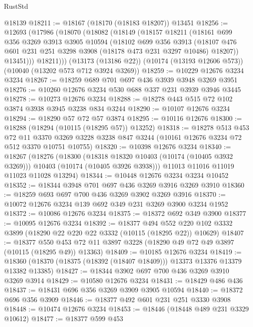 \begin{lexlean}{RustStd}
\begin{coremodule}
    @18139
@18211 := @18167 (@18170 (@18183 @18207)) @13451
@18256 := @12693
    (@17986
      (@18070
        (@18082
          (@18149
            (@18157
              @18211
              (@18161
                @699
                @356
                @3269
                @3913
                @3905
                @10594
                (@18102
                  @699
                  @356
                  @3913
                  (@18107 @476 @601 @231 @251 @3298 @3908 (@18178 @473 @231 @3297 @10486) @18207))
                @13451)))
          @18211)))
    (@13173 (@13186 @22))
    (@10174 (@13193 @12606 @573))
    (@10040 (@13202 @573 @712 @3924 @3269))
@18259 := @10229 @12676 @3234 @3234
@18267 := @18259 @689 @701 @697 @436 @3939 @3948 @3269 @3951
@18276 := @10260 @12676 @3234 @530 @688 @337 @231 @3939 @3946 @3445
@18278 := @10273 @12676 @3234
@18288 := @18278 @443 @515 @72 @102 @3874 @3938 @3945 @3238 @834 @3244
@18290 := @10107 @12676 @3234
@18294 := @18290 @57 @72 @57 @3874
@18295 := @10116 @12676
@18300 := @18288 (@18294 (@10115 (@18295 @57)) @13252)
@18318 := @18278
    @513
    @453
    @72
    @11
    @3370
    @3269
    @3228
    @3238
    @847
    @3244
    (@10161 @12676 @3234 @72 @512 @3370 @10751 @10755)
@18320 := @10398 @12676 @3234
@18340 := @18267
    (@18276
      (@18300
        (@18318 @18320 @10403 (@10174 (@10405 @3932 @3269)))
        @10403
        (@10174 (@10405 @3926 @3938)))
      @11013
      @11016
      @11019
      @11023
      @11028
      @13294)
@18344 := @10448 @12676 @3234 @3234 @10452
@18352 := @18344 @3948 @701 @697 @436 @3269 @3916 @3269 @3910
@18360 := @18259 @693 @697 @700 @436 @3269 @3902 @3269 @3916
@18370 := @10072 @12676 @3234 @139 @692 @349 @231 @3269 @3900 @3234 @1952
@18372 := @10086 @12676 @3234
@18375 := @18372 @692 @349 @3900
@18377 := @10095 @12676 @3234
@18392 := @18377
    @494
    @552
    @220
    @102
    @3332
    @3899
    (@18290 @22 @220 @22 @3332 (@10115 (@18295 @22)) @10629)
@18407 := @18377
    @550
    @453
    @72
    @11
    @3897
    @3228
    (@18290 @49 @72 @49 @3897 (@10115 (@18295 @49)) @13363)
@18409 := @10185 @12676 @3234
@18419 := @18360 (@18370 (@18375 (@18392 (@18407 @18409))) @13373 @13376 @13379 @13382 @13385)
@18427 := @18344 @3902 @697 @700 @436 @3269 @3910 @3269 @3914
@18429 := @10580 @12676 @3234
@18431 := @18429 @486 @436
@18437 := @18431 @696 @356 @3269 @3909 @3905 @10594
@18440 := @18372 @696 @356 @3909
@18446 := @18377 @492 @601 @231 @251 @3330 @3908
@18448 := @10474 @12676 @3234
@18453 := @18446 (@18448 @489 @231 @3329 @10612)
@18477 := @18377
    @599
    @453

\end{coremodule}
\end{lexlean}
